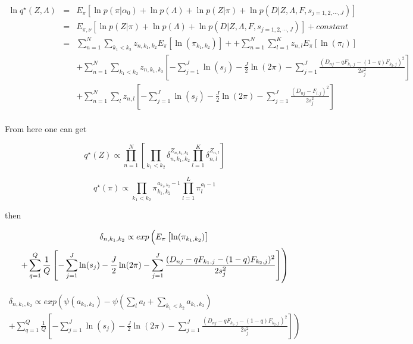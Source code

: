\documentclass[11pt,authoryear]{article}
\begin{document}
\begin{eqnarray}
\ln q^{\star} (Z, \Lambda)  & = & E_{\pi} \left [ \ln p(\pi|\alpha_0) +  \ln p(\Lambda ) + \ln p(Z | \pi) + \ln p(D | Z, \Lambda, F, s_{j=1,2,\cdots,J}) \right ] \\ \nonumber
  & = & E_{\pi, \nu} \left [ \ln p(Z | \pi) + \ln p(\Lambda ) + \ln p(D | Z, \Lambda, F, s_{j=1,2,\cdots,J}) \right] + constant \\\nonumber
  & = & \sum_{n=1}^{N} \sum_{k_1 < k_2} z_{n, k_1, k_2}  E_{\pi} \left [ \ln (\pi_{k_1, k_2}) \right ]  + +  \sum_{n=1}^{N} \sum_{l=1}^{K} z_{n, l} E_{\pi} \left [ \ln (\pi_{l}) \right ] \\ \nonumber
  &&  + \sum_{n=1}^{N} \sum_{k_1 < k_2} z_{n, k_1, k_2} \left [ - \sum_{j=1}^{J} \ln (s_j) - \frac{J}{2} \ln (2 \pi) - \sum_{j=1}^{J} \frac{(D_{nj} - qF_{k_1,j} - (1-q)F_{k_2,j})^2}{2s^2_j} \right] \\ \nonumber
  &&  +  \sum_{n=1}^{N} \sum_{l}  z_{n, l} \left [ - \sum_{j=1}^{J} \ln (s_j) - \frac{J}{2} \ln (2 \pi) - \sum_{j=1}^{J} \frac{(D_{nj} - F_{l,j} )^2}{2s^2_j} \right] \\ \nonumber 
\end{eqnarray}

From here one can get 

$$ q^{\star}(Z) \propto \prod_{n=1}^{N} \left[\prod_{k_1 < k_2} \delta_{n, k_1, k_2}^{Z_{n, k_1, k_2}}  \prod_{l=1}^{K} \delta_{n, l}^{Z_{n, l}} \right]$$

$$ q^{\star} (\pi) \propto  \prod_{k_1 < k_2} \pi_{k_1, k_2}^{a_{k_1,k_2} -1} \prod_{l=1}^{L} \pi_{l}^{a_{l} -1}$$

%
%
%
then 

\begin{multline}
 $$ \delta_{n, k_1, k_2} \propto exp \left (  E_{\pi} \left [ \ln (\pi_{k_1,k_2}) \right]  \right. \\
 \left . +  \sum_{q=1}^{Q} \frac{1}{Q} \left [ - \sum_{j=1}^{J} \ln (s_j)  - \frac{J}{2} \ln (2 \pi) - \sum_{j=1}^{J} \frac{(D_{nj} - qF_{k_1,j} - (1-q)F_{k_2,j})^2}{2s^2_j} \right] \right ) 
\end{multline}

\begin{multline}
  \delta_{n, k_1, k_2} \propto exp \left ( \psi({a_{k_1, k_2}}) - \psi(\sum_{l} a_{l} + \sum_{k_1 < k_2} a_{k_1, k_2})   \right . \\
  \left . + \sum_{q=1}^{Q} \frac{1}{Q} \left [ - \sum_{j=1}^{J} \ln (s_j)  - \frac{J}{2} \ln (2 \pi) -  \sum_{j=1}^{J} \frac{(D_{nj} - qF_{k_1,j} - (1-q)F_{k_2,j})^2}{2s^2_j} \right] \right ) 
\end{multline}
\end{document}
